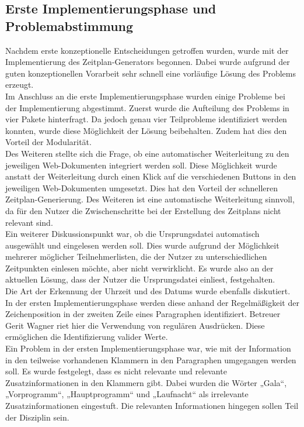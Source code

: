 \subsection{Erste Implementierungsphase und Problemabstimmung}
Nachdem erste konzeptionelle Entscheidungen getroffen wurden, wurde mit der Implementierung des Zeitplan-Generators begonnen. Dabei wurde aufgrund der guten konzeptionellen Vorarbeit sehr schnell eine vorläufige Lösung des Problems erzeugt.\\
Im Anschluss an die erste Implementierungsphase wurden einige Probleme bei der Implementierung abgestimmt. Zuerst wurde die Aufteilung des Problems in vier Pakete hinterfragt. Da jedoch genau vier Teilprobleme identifiziert werden konnten, wurde diese Möglichkeit der Lösung beibehalten. Zudem hat dies den Vorteil der Modularität.\\
Des Weiteren stellte sich die Frage, ob eine automatischer Weiterleitung zu den jeweiligen Web-Dokumenten integriert werden soll. Diese Möglichkeit wurde anstatt der Weiterleitung durch einen Klick auf die verschiedenen Buttons in den jeweiligen Web-Dokumenten umgesetzt. Dies hat den Vorteil der schnelleren Zeitplan-Generierung. Des Weiteren ist eine automatische Weiterleitung sinnvoll, da für den Nutzer die Zwischenschritte bei der Erstellung des Zeitplans nicht relevant sind. \\
Ein weiterer Diskussionspunkt war, ob die Ursprungsdatei automatisch ausgewählt und eingelesen werden soll. Dies wurde aufgrund der Möglichkeit mehrerer möglicher Teilnehmerlisten, die der Nutzer zu unterschiedlichen Zeitpunkten einlesen möchte, aber nicht verwirklicht. Es wurde also an der aktuellen Lösung, dass der Nutzer die Ursprungsdatei einliest, festgehalten.\\
Die Art der Erkennung der Uhrzeit und des Datums wurde ebenfalls diskutiert. In der ersten Implementierungsphase werden diese anhand der Regelmäßigkeit der Zeichenposition in der zweiten Zeile eines Paragraphen identifiziert. Betreuer Gerit Wagner riet hier die Verwendung von regulären Ausdrücken. Diese ermöglichen die Identifizierung valider Werte.\\
Ein Problem in der ersten Implementierungsphase war, wie mit der Information in den teilweise vorhandenen Klammern in den Paragraphen umgegangen werden soll. Es wurde festgelegt, dass es nicht relevante und relevante Zusatzinformationen in den Klammern gibt. Dabei wurden die Wörter „Gala“, „Vorprogramm“, „Hauptprogramm“ und „Laufnacht“ als irrelevante Zusatzinformationen eingestuft. Die relevanten Informationen hingegen sollen Teil der Disziplin sein.\\
